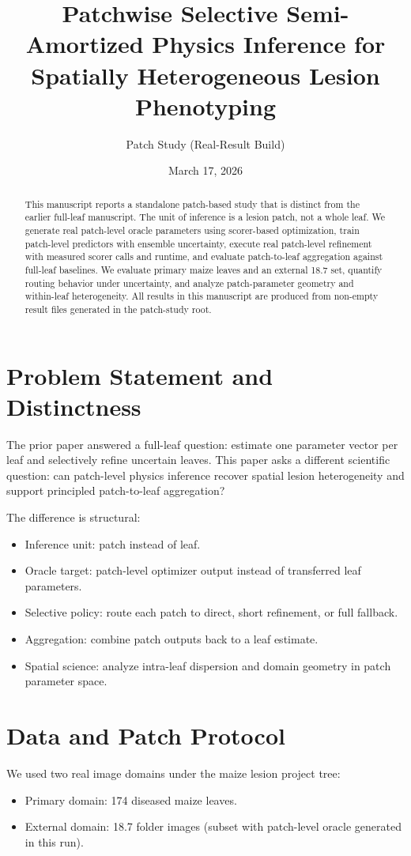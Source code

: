 \documentclass[11pt,a4paper]{article}
\title{Patchwise Selective Semi-Amortized Physics Inference for Spatially Heterogeneous Lesion Phenotyping}
\author{Patch Study (Real-Result Build)}
\date{March 17, 2026}
\begin{document}
\maketitle

\begin{abstract}
This manuscript reports a standalone patch-based study that is distinct from the earlier full-leaf manuscript. The unit of inference is a lesion patch, not a whole leaf. We generate real patch-level oracle parameters using scorer-based optimization, train patch-level predictors with ensemble uncertainty, execute real patch-level refinement with measured scorer calls and runtime, and evaluate patch-to-leaf aggregation against full-leaf baselines. We evaluate primary maize leaves and an external 18.7 set, quantify routing behavior under uncertainty, and analyze patch-parameter geometry and within-leaf heterogeneity. All results in this manuscript are produced from non-empty result files generated in the patch-study root.
\end{abstract}

\section{Problem Statement and Distinctness}
The prior paper answered a full-leaf question: estimate one parameter vector per leaf and selectively refine uncertain leaves. This paper asks a different scientific question: can patch-level physics inference recover spatial lesion heterogeneity and support principled patch-to-leaf aggregation?

The difference is structural:
\begin{itemize}
\item Inference unit: patch instead of leaf.
\item Oracle target: patch-level optimizer output instead of transferred leaf parameters.
\item Selective policy: route each patch to direct, short refinement, or full fallback.
\item Aggregation: combine patch outputs back to a leaf estimate.
\item Spatial science: analyze intra-leaf dispersion and domain geometry in patch parameter space.
\end{itemize}

\section{Data and Patch Protocol}
We used two real image domains under the maize lesion project tree:
\begin{itemize}
\item Primary domain: 174 diseased maize leaves.
\item External domain: 18.7 folder images (subset with patch-level oracle generated in this run).
\end{itemize}
\end{document}
